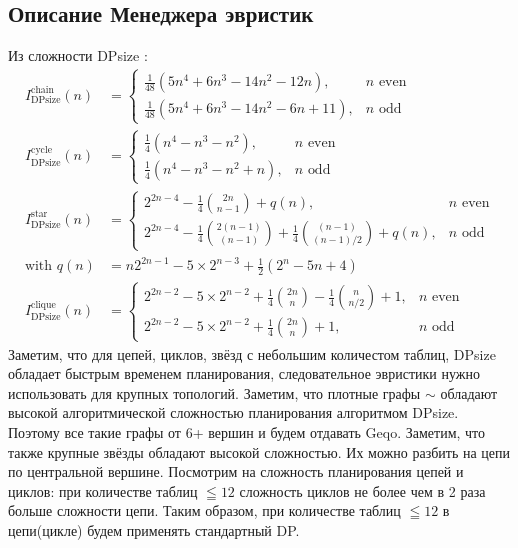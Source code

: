 \documentclass[12pt]{article}
\begin{document}
\begin{flushleft}
\section*{Описание Менеджера эвристик}
Из сложности DPsize \cite{Moerkotte}:
\begin{align*}
    I^{\text{chain}}_{\text{DPsize}}(n) &=
    \begin{cases}
        \frac{1}{48} (5n^4 + 6n^3 - 14n^2 - 12n), & n \text{ even} \\
        \frac{1}{48} (5n^4 + 6n^3 - 14n^2 - 6n + 11), & n \text{ odd}
    \end{cases}
    \\
    I^{\text{cycle}}_{\text{DPsize}}(n) &=
    \begin{cases}
        \frac{1}{4} (n^4 - n^3 - n^2), & n \text{ even} \\
        \frac{1}{4} (n^4 - n^3 - n^2 + n), & n \text{ odd}
    \end{cases}
    \\
    I^{\text{star}}_{\text{DPsize}}(n) &=
    \begin{cases}
        2^{2n-4} - \frac{1}{4} \binom{2n}{n-1} + q(n), & n \text{ even} \\
        2^{2n-4} - \frac{1}{4} \binom{2(n-1)}{(n-1)} + \frac{1}{4} \binom{(n-1)}{(n-1)/2} + q(n), & n \text{ odd}
    \end{cases}
    \\
    \text{with } q(n) &= n 2^{2n-1} - 5 \times 2^{n-3} + \frac{1}{2} (2^n - 5n + 4)
    \\
    I^{\text{clique}}_{\text{DPsize}}(n) &=
    \begin{cases}
        2^{2n-2} - 5 \times 2^{n-2} + \frac{1}{4} \binom{2n}{n} - \frac{1}{4} \binom{n}{n/2} + 1, & n \text{ even} \\
        2^{2n-2} - 5 \times 2^{n-2} + \frac{1}{4} \binom{2n}{n} + 1, & n \text{ odd}
    \end{cases}
\end{align*}
Заметим, что для цепей, циклов, звёзд с небольшим количестом таблиц, DPsize обладает быстрым временем планирования, следовательное эвристики нужно использовать для крупных топологий.
Заметим, что плотные графы $\sim$  обладают высокой алгоритмической сложностью планирования
алгоритмом DPsize. Поэтому все такие графы от 6+ вершин и будем отдавать Geqo. 
Заметим, что также крупные звёзды обладают высокой сложностью. Их можно разбить на цепи по центральной вершине.
Посмотрим на сложность планирования цепей и циклов: при количестве таблиц $\leqq 12$ сложность циклов не более чем в 2 раза 
больше сложности цепи. Таким образом, при количестве таблиц $\leqq 12$ в цепи(цикле) будем применять стандартный DP.


\end{flushleft}
\end{document}
